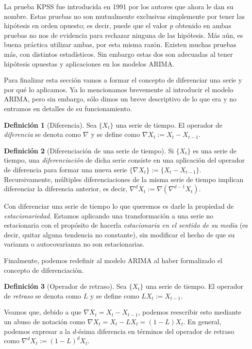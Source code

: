 \documentclass[11pt,letterpaper]{article}
\theoremstyle{definition}
\newtheorem{definition}{Definición}[section]
\theoremstyle{theorem}
\theoremstyle{remark}
\begin{document}
	La prueba KPSS fue introducida en 1991\autocite{kwiatkowski1991testing} por los autores que ahora le dan su nombre. Estas pruebas no son mutualmente exclusivas simplemente por tener las hipótesis en orden opuesto; es decir, puede que el valor \(p\) obtenido en ambas pruebas no nos de evidencia para rechazar ninguna de las hipótesis. Más aún, es buena práctica utilizar ambas, por esta misma razón. Existen muchas pruebas más, con distintos estadísticos. Sin embargo estas dos son adecuadas al tener hipótesis opuestas y aplicaciones en los modelos ARIMA. \par
	Para finalizar esta sección vamos a formar el concepto de diferenciar una serie y por qué lo aplicamos. Ya lo mencionamos brevemente al introducir el modelo ARIMA, pero sin embargo, sólo dimos un breve descriptivo de lo que era y no entramos en detalles de su funcionamiento.
	\begin{definition}[Diferencia]
		Sea \(\{X_t\}\) una serie de tiempo. El operador de \textit{diferencia} se denota como \(\nabla\) y se define como \(\nabla X_t:=X_t-X_{t-1}\).
	\end{definition}
	\begin{definition}[Diferenciación de una serie de tiempo]
		Si \(\{X_t\}\) es una serie de tiempo, una \textit{diferenciación} de dicha serie consiste en una aplicación del operador de diferencia para formar una nueva serie \(\{\nabla X_t\}:=\{X_t-X_{t-1}\}\). Recursivamente, múltiples diferenciaciones de la misma serie de tiempo implican diferenciar la diferencia anterior, es decir, \(\nabla^dX_t:=\nabla(\nabla^{d-1}X_t)\).
	\end{definition}
	Con diferenciar una serie de tiempo lo que queremos es darle la propiedad de \textit{estacionariedad}. Estamos aplicando una transformación a una serie no estacionaria con el propósito de hacerla \textit{estacionaria en el sentido de su media} (es decir, quitar alguna tendencia no constante), sin modificar el hecho de que su varianza o autocovarianza no son estacionarias. \par
	Finalmente, podemos redefinir al modelo ARIMA al haber formalizado el concepto de diferenciación.
	\begin{definition}[Operador de retraso]
		Sea \(\{X_t\}\) una serie de tiempo. El operador de \textit{retraso} se denota como \(L\) y se define como \(LX_t:=X_{t-1}\).
	\end{definition}
	Veamos que, debido a que \(\nabla X_t=X_t-X_{t-1}\), podemos reescribir esto mediante un abuso de notación como \(\nabla X_t=X_t-LX_t=(1-L)X_t\). En general, podemos expresar a la \(d\)-ésima diferencia en términos del operador de retraso como \(\nabla^dX_t:=(1-L)^dX_t\).
\end{document}
